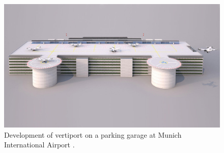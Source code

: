 


\begin{figure}[!ht]
    \centering
    \includegraphics[width=.6\textwidth]{img/vertiport.jpeg}
    \caption{Development of vertiport on a parking garage at Munich International Airport \cite{amd_vertiport}.}
    \label{vertiport}
\end{figure}